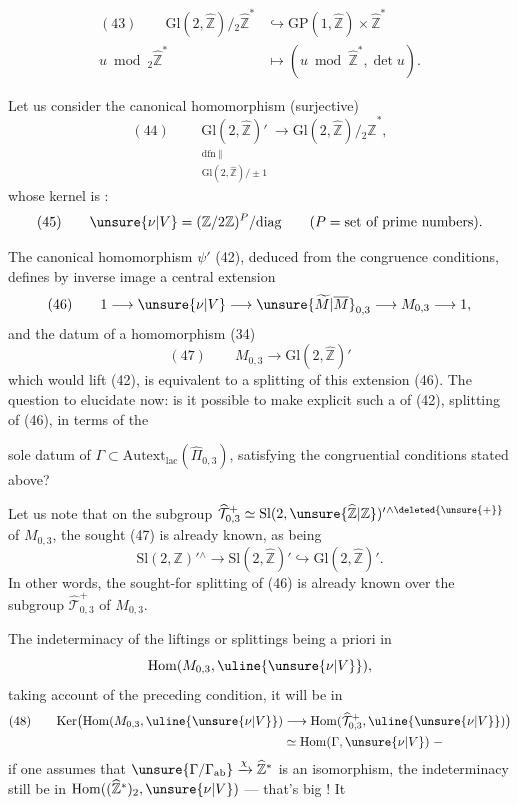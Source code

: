 
\[
\begin{aligned}
(43)\qquad
\mathrm{Gl}(2,\widehat{\mathbb Z})/{}_{2}\widehat{\mathbb Z}^{*}
&\hookrightarrow \mathrm{GP}(1,\widehat{\mathbb Z})\times\widehat{\mathbb Z}^{*}\\
u\bmod {}_{2}\widehat{\mathbb Z}^{*}
&\longmapsto (u\bmod\widehat{\mathbb Z}^{*},\det u).
\end{aligned}
\]

Let us consider the canonical homomorphism (surjective)
\[
(44)\qquad
\underset{\substack{\mathrm{dfn}\;\Vert\\
\mathrm{Gl}(2,\widehat{\mathbb Z})/\pm1}}
{\mathrm{Gl}(2,\widehat{\mathbb Z})'}
\longrightarrow \mathrm{Gl}(2,\widehat{\mathbb Z})/{}_{2}\widehat{\mathbb Z}^{*},
\]
whose kernel is :
\[
(45)\qquad
\unsure{\nu|V}=(\mathbb Z/2\mathbb Z)^P/\mathrm{diag}
\qquad (P=\text{set of prime numbers}).
\]

The canonical homomorphism $\psi'$ (42), deduced from the congruence conditions,
defines by inverse image a central extension
\[
(46)\qquad
1\longrightarrow\unsure{\nu|V}\longrightarrow
\unsure{\widetilde{M}|\overline{M}}_{0,3}\longrightarrow
M_{0,3}\longrightarrow1,
\]
and the datum of a homomorphism (34)
\[
(47)\qquad
M_{0,3}\longrightarrow\mathrm{Gl}(2,\widehat{\mathbb Z})'
\]
which would lift (42), is equivalent to  a
splitting of this extension (46). The question to elucidate now:
is it possible to make explicit such a   of
(42),  splitting of (46), in terms of the


sole datum of $\Gamma\subset\mathrm{Autext}_{\mathrm{lac}}
(\widehat{\Pi}_{0,3})$, satisfying the congruential conditions
stated above?

Let us note that on the subgroup
$\widehat{\mathcal T}_{0,3}^{+}
\simeq \mathrm{Sl}(2,\unsure{\widehat{\mathbb Z}|\mathbb Z})'{}^{\wedge\deleted{\unsure{+}}}$
of $M_{0,3}$, the 
sought (47) is already known, as being
\[
\mathrm{Sl}(2,\mathbb Z)'{}^{\wedge}\longrightarrow
\mathrm{Sl}(2,\widehat{\mathbb Z})'\hookrightarrow
\mathrm{Gl}(2,\widehat{\mathbb Z})'.
\]
In other words, the sought-for splitting of (46) is already known over
the subgroup $\widehat{\mathcal T}_{0,3}^{+}$
of $M_{0,3}$.

The indeterminacy of the liftings or splittings being a priori in
\[
\mathrm{Hom}(M_{0,3},\uline{\unsure{\nu|V}}),
\]
taking account of the preceding condition, it will be in
\[
\begin{aligned}
(48)\qquad
\mathrm{Ker}\bigl(\mathrm{Hom}(M_{0,3},\uline{\unsure{\nu|V}})
&\longrightarrow
\mathrm{Hom}(\widehat{\mathcal T}_{0,3}^{+},
\uline{\unsure{\nu|V}})\bigr)\\
&\simeq\mathrm{Hom}(\Gamma,\unsure{\nu|V})\;-
\end{aligned}
\]
if one assumes that
$\unsure{\Gamma/\Gamma_{\mathrm{ab}}}\xrightarrow{\chi}\widehat{\mathbb Z}^{*}$
is an isomorphism, the indeterminacy  still be in
$\mathrm{Hom}((\widehat{\mathbb Z}^{*})_2,\unsure{\nu|V})$
--- that's big ! It

